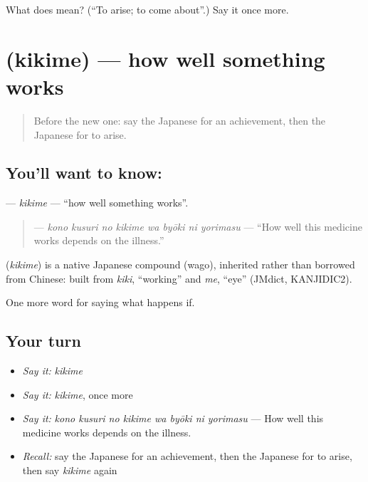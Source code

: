 \begin{tcolorbox}[breakable,colback=teal!4,colframe=teal!35!black,title={Before you move on}]
What does  mean? (\textquotedblleft{}To arise; to come about\textquotedblright{}.) Say it once more.
\end{tcolorbox}
\section[\texorpdfstring{\ja{ききめ} (kikime)}{ききめ (kikime)}]{ (kikime) — how well something works}

\label{lesson:JA-C511-kikime}



\begin{quote}
Before the new one: say the Japanese for an achievement, then the Japanese for to arise.
\end{quote}

\subsection*{You'll want to know: }
\textbf{} — \emph{kikime} — \textquotedblleft{}how well something works\textquotedblright{}.

\begin{quote}
\textbf{    } — \emph{kono kusuri no kikime wa byōki ni yorimasu} — \textquotedblleft{}How well this medicine works depends on the illness.\textquotedblright{}
\end{quote}

\begin{cousinweb}
\textbf{} (\emph{kikime}) is a native Japanese compound (wago), inherited rather than borrowed from Chinese: built from \emph{kiki}, \textquotedblleft{}working\textquotedblright{} and \emph{me}, \textquotedblleft{}eye\textquotedblright{} (JMdict, KANJIDIC2).
\end{cousinweb}

\begin{grammarlens}[title={What you've built}]
One more word for saying what happens if.
\end{grammarlens}

\subsection*{Your turn}
\begin{itemize}
\raggedright
  \item \emph{Say it:} \emph{kikime}
  \item \emph{Say it:} \emph{kikime}, once more
  \item \emph{Say it:} \emph{kono kusuri no kikime wa byōki ni yorimasu} — How well this medicine works depends on the illness.
  \item \emph{Recall:} say the Japanese for an achievement, then the Japanese for to arise, then say \emph{kikime} again
\end{itemize}

